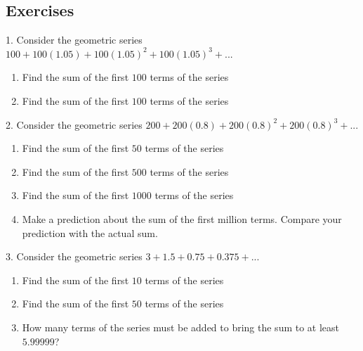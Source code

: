 \documentclass[10pt,]{book}
\theoremstyle{plain}
\theoremstyle{definition}
\theoremstyle{definition}
\theoremstyle{definition}
\numberwithin{equation}{section}
\begin{document}
\typeout{************************************************}
\typeout{************************************************}
\subsection[{Exercises}]{Exercises}\label{exercises-6}
\begin{exerciselist}
\item[1.]\hypertarget{exercise-32}{}Consider the geometric series \(100+100(1.05)+100(1.05)^2+100(1.05)^3+...\)%
\leavevmode%
\begin{enumerate}[label=(\alph*)]
\item\hypertarget{li-65}{}Find the sum of the first \(100\) terms of the series%
\item\hypertarget{li-66}{}Find the sum of the first \(100\) terms of the series%
\end{enumerate}
\par\smallskip
\item[2.]\hypertarget{exercise-33}{}Consider the geometric series \(200+200(0.8)+200(0.8)^2+200(0.8)^3+...\)%
\leavevmode%
\begin{enumerate}[label=(\alph*)]
\item\hypertarget{li-67}{}Find the sum of the first \(50\) terms of the series%
\item\hypertarget{li-68}{}Find the sum of the first \(500\) terms of the series%
\item\hypertarget{li-69}{}Find the sum of the first \(1000\) terms of the series%
\item\hypertarget{li-70}{}Make a prediction about the sum of the first million terms. Compare your prediction with the actual sum.%
\end{enumerate}
\par\smallskip
\item[3.]\hypertarget{exercise-34}{}Consider the geometric series \(3+1.5+0.75+0.375+...\)%
\leavevmode%
\begin{enumerate}[label=(\alph*)]
\item\hypertarget{li-71}{}Find the sum of the first \(10\) terms of the series%
\item\hypertarget{li-72}{}Find the sum of the first \(50\) terms of the series%
\item\hypertarget{li-73}{}How many terms of the series must be added to bring the sum to at least \(5.99999\)?%
\end{enumerate}
\par\smallskip

\end{exerciselist}
\end{document}
